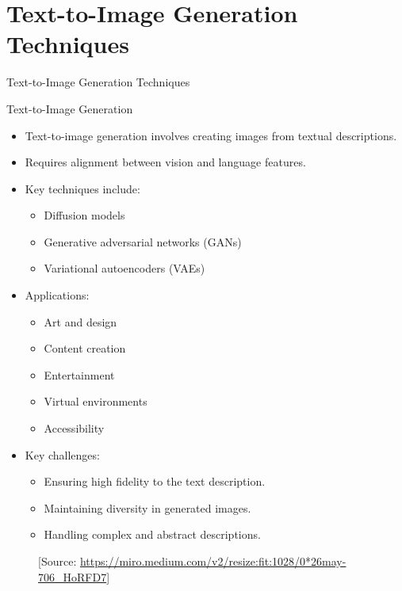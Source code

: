 \section{Text-to-Image Generation Techniques}
\begin{frame}{}
    \LARGE Text-to-Image Generation Techniques
\end{frame}

\begin{frame}[allowframebreaks]{Text-to-Image Generation}
    \begin{itemize}
        \item Text-to-image generation involves creating images from textual descriptions.
        \item Requires alignment between vision and language features.
        \item Key techniques include:
        \begin{itemize}
            \item Diffusion models
            \item Generative adversarial networks (GANs)
            \item Variational autoencoders (VAEs)
        \end{itemize}
        \item Applications:
        \begin{itemize}
            \item Art and design
            \item Content creation
            \item Entertainment
            \item Virtual environments
            \item Accessibility
        \end{itemize}
    \end{itemize}
\framebreak
    \begin{itemize}
        \item Key challenges:
        \begin{itemize}
            \item Ensuring high fidelity to the text description.
            \item Maintaining diversity in generated images.
            \item Handling complex and abstract descriptions.
        \end{itemize}
    \end{itemize}
\framebreak
    \begin{figure}
        \centering
        \caption*{\scriptsize [Source: \url{https://miro.medium.com/v2/resize:fit:1028/0*26may-706_HoRFD7}]}
    \end{figure}
\end{frame}

